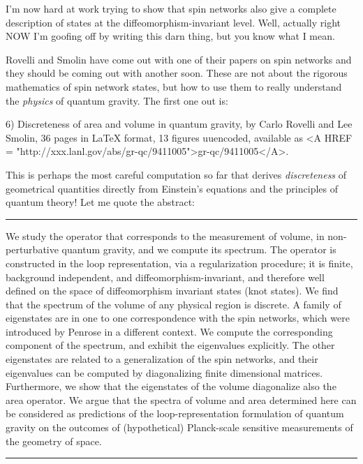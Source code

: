 I'm now hard at work trying to show that spin networks also give a
complete description of states at the diffeomorphism-invariant level.
Well, actually right NOW I'm goofing off by writing this darn thing, but
you know what I mean.

Rovelli and Smolin have come out with one of their papers on spin
networks and they should be coming out with another soon.  These are not
about the rigorous mathematics of spin network states, but how to use
them to really understand the \emph{physics} of quantum gravity.  The first
one out is:

6) Discreteness of area and volume in quantum gravity, by Carlo Rovelli
and Lee Smolin, 36 pages in LaTeX format, 13 figures uuencoded,
available as <A HREF = "http://xxx.lanl.gov/abs/gr-qc/9411005">gr-qc/9411005</A>.

This is perhaps the most careful computation so far that derives
\emph{discreteness} of geometrical quantities directly from Einstein's
equations and the principles of quantum theory!  Let me quote the
abstract:

\par\noindent\rule{\textwidth}{0.4pt}
We study the operator that corresponds to the measurement of
volume, in non-perturbative quantum gravity, and we compute its
spectrum.  The operator is constructed in the loop representation, via
a regularization procedure; it is finite, background independent, and
diffeomorphism-invariant, and therefore well defined on the space of
diffeomorphism invariant states (knot states).  We find that the
spectrum of the volume of any physical region is discrete.  A family
of eigenstates are in one to one correspondence with the spin
networks, which were introduced by Penrose in a different context.
We compute the corresponding component of the spectrum, and
exhibit the eigenvalues explicitly.   The other eigenstates are related
to a generalization of the spin networks, and their eigenvalues can be
computed by diagonalizing finite dimensional matrices.  Furthermore,
we show that the eigenstates of the volume diagonalize also the area
operator.  We argue that the spectra of volume and area determined
here can be considered as predictions of the loop-representation
formulation of quantum gravity on the outcomes of (hypothetical)
Planck-scale sensitive measurements of the geometry of space.
\par\noindent\rule{\textwidth}{0.4pt}
